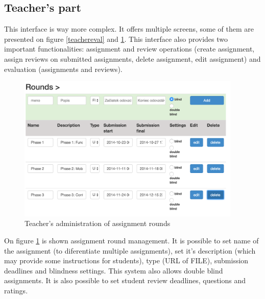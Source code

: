 \subsection{Teacher's part}

This interface is way more complex. It offers multiple screens, some of them are presented on figure \ref{teachereval} and \ref{teacherrounds}. This interface also provides two important functionalities: assignment and review operations (create assignment, assign reviews on submitted assignments, delete assignment, edit assignment) and evaluation (assignments and reviews).



\begin{figure}[h]
    \centering
    \includegraphics[width=0.95\textwidth]{images/teacherrounds.png}
    \caption{Teacher's administration of assignment rounds}
    \label{teacherrounds}
\end{figure}


On figure \ref{teacherrounds} is shown assignment round management. It is possible to set name of the assignment (to diferentiate multiple assignments), set it's description (which may provide some instructions for students), type (URL of FILE), submission deadlines and blindness settings. This system also allows double blind assignments. It is also possible to set student review deadlines, questions and ratings.

